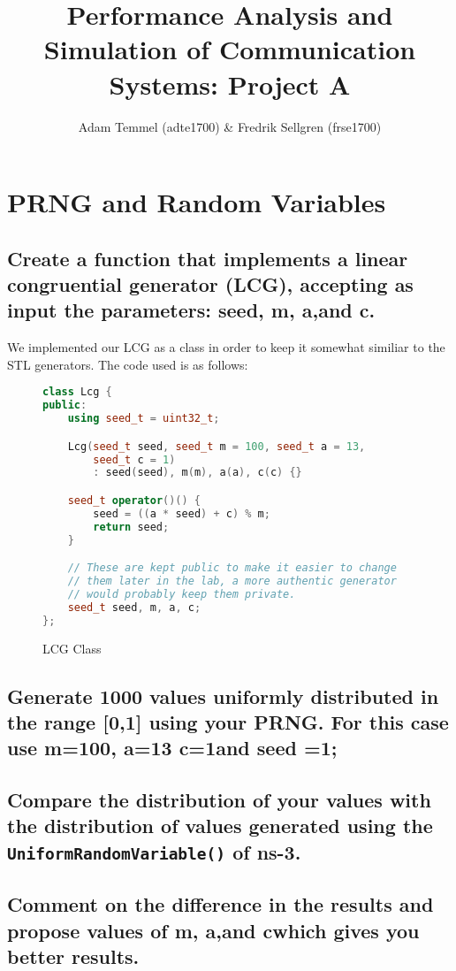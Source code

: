 \documentclass[a4paper, titlepage,12pt]{article}
\title{Performance Analysis and Simulation of Communication Systems: Project A}
\author{Adam Temmel (adte1700) \& Fredrik Sellgren (frse1700)}
\begin{document}
	\maketitle
	\section{PRNG and Random Variables}
		\subsection{Create a function that implements a linear congruential generator (LCG), accepting as input the parameters: seed, m, a,and c.}
			We implemented our LCG as a class in order to keep it somewhat similiar to the STL generators. The code used is as follows:

			\begin{figure}[h!]
				\begin{lstlisting}[language=c++]
class Lcg {
public:
	using seed_t = uint32_t;

	Lcg(seed_t seed, seed_t m = 100, seed_t a = 13, 
		seed_t c = 1) 
		: seed(seed), m(m), a(a), c(c) {}

	seed_t operator()() {
		seed = ((a * seed) + c) % m;
		return seed;
	}

	// These are kept public to make it easier to change 
	// them later in the lab, a more authentic generator
	// would probably keep them private.
	seed_t seed, m, a, c;
};
				\end{lstlisting}
				\caption{LCG Class}
				\label{fig:lcgimpl}
			\end{figure}



		\subsection{Generate 1000 values uniformly distributed in the range [0,1] using your PRNG. For this case use m=100, a=13 c=1and seed =1;}
		\subsection{Compare the distribution of your values with the distribution of values generated using the \\
		\lstinline{UniformRandomVariable()} of ns-3.}
		\subsection{Comment on the difference in the results and propose values of m, a,and cwhich gives you better results.}
\end{document}
